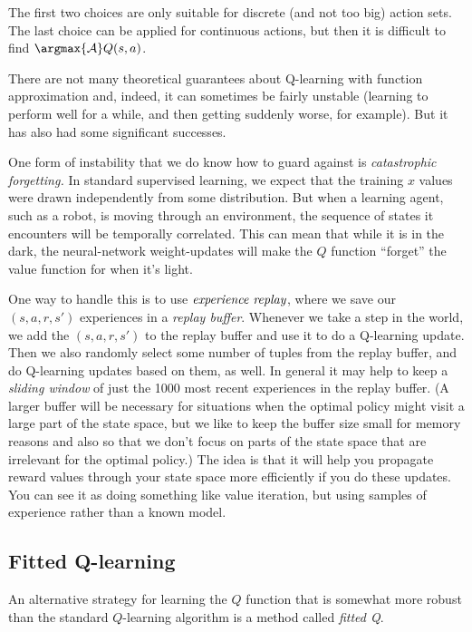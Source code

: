 The first two choices are only suitable for discrete (and not too big)
action sets.  The last choice can be applied for continuous actions,
but then it is  difficult to find $\argmax{\mathcal A} Q(s, a)$.  

There are not many theoretical guarantees about Q-learning with
function approximation and, indeed,  it can sometimes be fairly
unstable (learning to perform well for a while, and then getting
suddenly worse, for example).  But it has also had some significant
successes. 

One form of instability that we do know how to guard against is {\em
  catastrophic forgetting.}  In standard supervised learning, we
expect that the training $x$ values were drawn independently from some
distribution.   But when a learning agent, such as a robot,
is moving through an environment, the sequence of states it encounters
will be temporally correlated.   This can
mean that while it is in the dark, the neural-network weight-updates
will make the $Q$ function ``forget'' the value function for when it's
light.

One way to handle this is to use $\emph{experience replay}$, where we
save our $(s,a,r,s')$ experiences in a {\it replay buffer}.
Whenever we take a step in the world, we add the $(s,a,r,s')$ to the
replay buffer and use it to do a Q-learning update.  Then we also
randomly select some number of tuples from the replay buffer, and do
Q-learning updates based on them, as well.  In general it may help to
keep a {\em sliding window} of just the 1000 most recent experiences
in the replay buffer.  (A larger buffer will be necessary for
situations when the optimal policy might visit a large part of the
state space, but we like to keep the buffer size small for memory
reasons and also so that we don't focus on parts of the state space
that are irrelevant for the optimal policy.)
The idea is that it will help you propagate reward values through your
state space more efficiently if you do these updates. You can see it
as doing something like value iteration, but using samples of
experience rather than a known model. 

\subsection{Fitted Q-learning}
An alternative strategy for learning the $Q$ function that is somewhat
more robust than the standard $Q$-learning algorithm is a method
called {\em fitted Q}.

